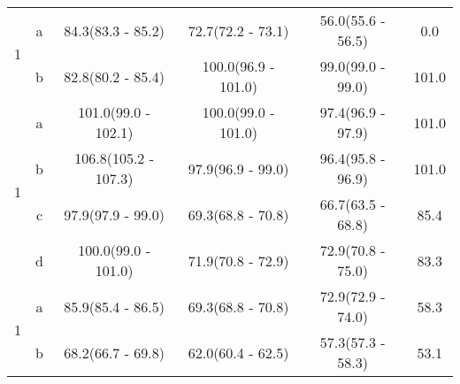 \begin{table}[H]
\begin{tabular}{c|c|c|c|c|c}
\multirow{2}{*}{1} & a & 84.3(83.3 - 85.2) & 72.7(72.2 - 73.1) & 56.0(55.6 - 56.5) & 0.0\\ 
 & b & 82.8(80.2 - 85.4) & 100.0(96.9 - 101.0) & 99.0(99.0 - 99.0) & 101.0\\ 
\hline

\multirow{4}{*}{1} & a & 101.0(99.0 - 102.1) & 100.0(99.0 - 101.0) & 97.4(96.9 - 97.9) & 101.0\\ 
 & b & 106.8(105.2 - 107.3) & 97.9(96.9 - 99.0) & 96.4(95.8 - 96.9) & 101.0\\ 
 & c & 97.9(97.9 - 99.0) & 69.3(68.8 - 70.8) & 66.7(63.5 - 68.8) & 85.4\\ 
 & d & 100.0(99.0 - 101.0) & 71.9(70.8 - 72.9) & 72.9(70.8 - 75.0) & 83.3\\ 
\hline

\multirow{2}{*}{1} & a & 85.9(85.4 - 86.5) & 69.3(68.8 - 70.8) & 72.9(72.9 - 74.0) & 58.3\\ 
 & b & 68.2(66.7 - 69.8) & 62.0(60.4 - 62.5) & 57.3(57.3 - 58.3) & 53.1\\ 
\hline

\hline\hline
		
	\end{tabular}
	\label{tab:resultsComplex2}
\end{table}